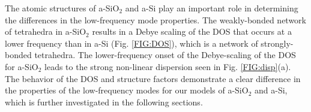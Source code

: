 \documentclass[aps,prb,twocolumn,superscriptaddress,footinbib,amsmath,amssymb,floatfix]{revtex4}
\begin{document}
The atomic structures of a-SiO$_2$ and a-Si play an important role 
in determining the differences in the low-frequency mode properties. 
The weakly-bonded network of tetrahedra in a-SiO$_2$
\cite{van_Beest_force_1990,kramer_interatomic_1991} 
results in a Debye 
scaling of the DOS that occurs at a lower frequency than in a-Si 
(Fig. \ref{FIG:DOS}), 
which is a network of strongly-bonded tetrahedra.
\cite{stillinger_computer_1985,
allen_diffusons_1999,barkema_high-quality_2000} 
The lower-frequency onset of the Debye-scaling of the DOS 
for a-SiO$_2$ leads to the strong non-linear dispersion 
seen in Fig. \ref{FIG:disp}(a). The behavior of the DOS and 
structure factors demonstrate a clear difference in the properties 
of the low-frequency modes for our models of a-SiO$_2$ and a-Si, which 
is further investigated in the following sections. 
\end{document}
